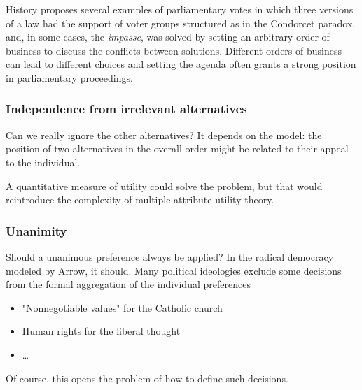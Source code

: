 History proposes several examples of parliamentary votes in which three versions of a law had the support of voter groups structured as in the Condorcet paradox, and, in some cases, the \textit{impasse}, was solved by setting an arbitrary order of business to discuss the conflicts between solutions. Different orders of business can lead to different choices and setting the agenda often grants a strong position in parliamentary proceedings.

\subsubsection{Independence from irrelevant alternatives}

Can we really ignore the other alternatives? It depends on the model: the position of two alternatives in the overall order might be related to their appeal to the individual.

A quantitative measure of utility could solve the problem, but that would reintroduce the complexity of multiple-attribute utility theory.

\subsubsection{Unanimity}

Should a unanimous preference always be applied? In the radical democracy modeled by Arrow, it should. Many political ideologies exclude some decisions from the formal aggregation of the individual preferences
\begin{itemize}
	\item "Nonnegotiable values" for the Catholic church
	
	\item Human rights for the liberal thought
	
	\item \dots
\end{itemize}

Of course, this opens the problem of how to define such decisions.

